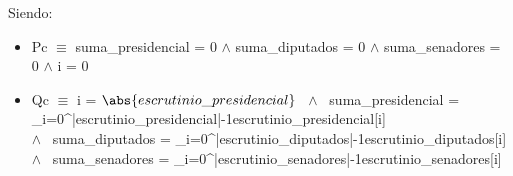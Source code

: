 \documentclass[10pt,a4paper]{article}
\begin{document}
Siendo:

\begin{itemize}
    \item Pc $\equiv$ suma\_presidencial = 0 $\land$ suma\_diputados = 0 $\land$ suma\_senadores = 0 $\land$ i = 0
    \item Qc $\equiv$ i = $\abs{escrutinio\_presidencial}$ \ $\land$ \ suma\_presidencial = \sum_{i=0}^{|escrutinio\_presidencial|-1}{escrutinio\_presidencial[i]} \\ $\land$ \ suma\_diputados = \sum_{i=0}^{|escrutinio\_diputados|-1}{escrutinio\_diputados[i]} \\ $\land$ \ suma\_senadores = \sum_{i=0}^{|escrutinio\_senadores|-1}{escrutinio\_senadores[i]}
\end{itemize} 

\vspace{5mm}
\end{document}

